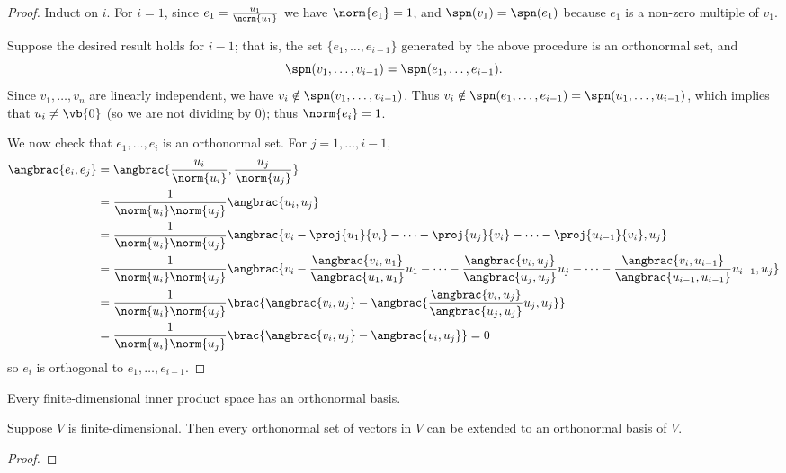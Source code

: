 \begin{proof}
Induct on $i$. For $i=1$, since $e_1=\frac{u_1}{\norm{u_1}}$ we have $\norm{e_1}=1$, and $\spn(v_1)=\spn(e_1)$ because $e_1$ is a non-zero multiple of $v_1$.

Suppose the desired result holds for $i-1$; that is, the set $\{e_1,\dots,e_{i-1}\}$ generated by the above procedure is an orthonormal set, and
\[\spn(v_1,\dots,v_{i-1})=\spn(e_1,\dots,e_{i-1}).\]
Since $v_1,\dots,v_n$ are linearly independent, we have $v_i\notin\spn(v_1,\dots,v_{i-1})$. Thus $v_i\notin\spn(e_1,\dots,e_{i-1})=\spn(u_1,\dots,u_{i-1})$, which implies that $u_i\neq\vb{0}$ (so we are not dividing by $0$); thus $\norm{e_i}=1$.

We now check that $e_1,\dots,e_i$ is an orthonormal set. For $j=1,\dots,i-1$,
\begin{align*}
\angbrac{e_i,e_j}
&=\angbrac{\frac{u_i}{\norm{u_i}},\frac{u_j}{\norm{u_j}}}\\
&=\frac{1}{\norm{u_i}\norm{u_j}}\angbrac{u_i,u_j}\\
&=\frac{1}{\norm{u_i}\norm{u_j}}\angbrac{v_i-\proj{u_1}{v_i}-\cdots-\proj{u_j}{v_i}-\cdots-\proj{u_{i-1}}{v_i},u_j}\\
&=\frac{1}{\norm{u_i}\norm{u_j}}\angbrac{v_i-\frac{\angbrac{v_i,u_1}}{\angbrac{u_1,u_1}}u_1-\cdots-\frac{\angbrac{v_i,u_j}}{\angbrac{u_j,u_j}}u_j-\cdots-\frac{\angbrac{v_i,u_{i-1}}}{\angbrac{u_{i-1},u_{i-1}}}u_{i-1},u_j}\\
&=\frac{1}{\norm{u_i}\norm{u_j}}\brac{\angbrac{v_i,u_j}-\angbrac{\frac{\angbrac{v_i,u_j}}{\angbrac{u_j,u_j}}u_j,u_j}}\\
&=\frac{1}{\norm{u_i}\norm{u_j}}\brac{\angbrac{v_i,u_j}-\angbrac{v_i,u_j}}=0
\end{align*}
so $e_i$ is orthogonal to $e_1,\dots,e_{i-1}$.


\end{proof}

\begin{corollary}
Every finite-dimensional inner product space has an orthonormal basis.
\end{corollary}

\begin{corollary}
Suppose $V$ is finite-dimensional. Then every orthonormal set of vectors in $V$ can be extended to an orthonormal basis of $V$.
\end{corollary}

\begin{proof}

\end{proof}

